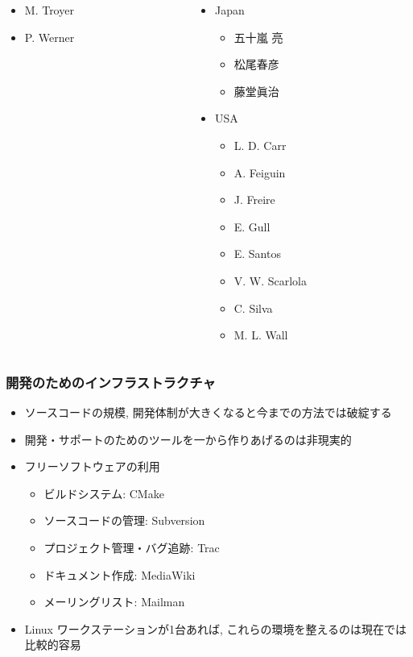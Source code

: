 \begin{frame}
\begin{columns}[T]
\begin{column}{.34\textwidth}
\begin{itemize}
\begin{itemize}
        \item M. Troyer
        \item P. Werner
        \end{itemize}
      \end{itemize}
    \end{column}
    \begin{column}{.35\textwidth}
      \begin{itemize}
      \item Japan
        \begin{itemize}
        \item 五十嵐 亮
        \item 松尾春彦
        \item 藤堂眞治
        \end{itemize}
      \item USA
        \begin{itemize}
        \item L. D. Carr
        \item A. Feiguin
        \item J. Freire
        \item E. Gull
        \item E. Santos
        \item V. W. Scarlola
        \item C. Silva
        \item M. L. Wall
        \end{itemize}
      \end{itemize}
    \end{column}
  \end{columns}
\end{frame}

\begin{frame}
  \frametitle{開発のためのインフラストラクチャ}
  \begin{itemize}
  \item ソースコードの規模, 開発体制が大きくなると今までの方法では破綻する
  \item 開発・サポートのためのツールを一から作りあげるのは非現実的
  \item フリーソフトウェアの利用
    \begin{itemize}
    \item ビルドシステム: CMake
    \item ソースコードの管理: Subversion
    \item プロジェクト管理・バグ追跡: Trac
    \item ドキュメント作成: MediaWiki
    \item メーリングリスト: Mailman
    \end{itemize}
  \item Linux ワークステーションが1台あれば, これらの環境を整えるのは現在では比較的容易
  \end{itemize}
\end{frame}


